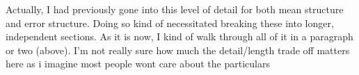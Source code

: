 \documentclass{article}
\begin{document}
Actually, I had previously gone into this level of detail for both mean structure and error structure. Doing so kind of necessitated breaking these into longer, independent sections. As it is now, I kind of walk through all of it in a paragraph or two (above). I'm not really sure how much the detail/length trade off matters here as i imagine most people wont care about the particulars



%
%
%
%
%
%
\end{document}
